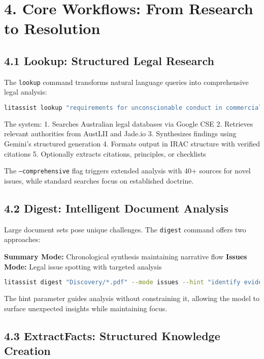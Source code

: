 \documentclass[12pt,a4paper]{article}
\begin{document}
\section*{4. Core Workflows: From Research to Resolution}

\subsection*{4.1 Lookup: Structured Legal Research}

The \texttt{lookup} command transforms natural language queries into comprehensive legal analysis:

\begin{lstlisting}[language=bash]
litassist lookup "requirements for unconscionable conduct in commercial transactions" --mode irac --comprehensive
\end{lstlisting}

The system:
1. Searches Australian legal databases via Google CSE
2. Retrieves relevant authorities from AustLII and Jade.io
3. Synthesizes findings using Gemini's structured generation
4. Formats output in IRAC structure with verified citations
5. Optionally extracts citations, principles, or checklists

The \texttt{--comprehensive} flag triggers extended analysis with 40+ sources for novel issues, while standard searches focus on established doctrine.

\subsection*{4.2 Digest: Intelligent Document Analysis}

Large document sets pose unique challenges. The \texttt{digest} command offers two approaches:

\textbf{Summary Mode:} Chronological synthesis maintaining narrative flow
\textbf{Issues Mode:} Legal issue spotting with targeted analysis

\begin{lstlisting}[language=bash]
litassist digest "Discovery/*.pdf" --mode issues --hint "identify evidence of financial misconduct and breach of fiduciary duty"
\end{lstlisting}

The hint parameter guides analysis without constraining it, allowing the model to surface unexpected insights while maintaining focus.

\subsection*{4.3 ExtractFacts: Structured Knowledge Creation}
\end{document}

